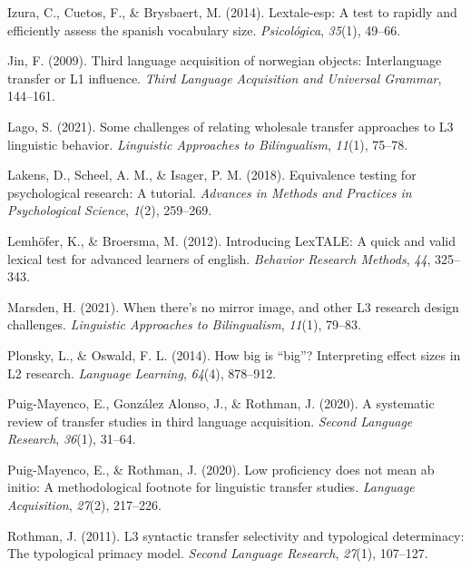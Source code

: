 \documentclass[
  man]{apa6}
\newlength{\cslhangindent}
\newlength{\cslentryspacingunit} %
\newenvironment{CSLReferences}[2] %
 {%
  \setlength{\parindent}{0pt}
  \ifodd #1
  \let\oldpar\par
  \def\par{\hangindent=\cslhangindent\oldpar}
  \fi
  \setlength{\parskip}{#2\cslentryspacingunit}
 }%
 {}
\begin{document}
\begin{CSLReferences}{1}{0}
\leavevmode{}%
Izura, C., Cuetos, F., \& Brysbaert, M. (2014). Lextale-esp: A test to rapidly and efficiently assess the spanish vocabulary size. \emph{Psicol{ó}gica}, \emph{35}(1), 49--66.

\leavevmode{}%
Jin, F. (2009). Third language acquisition of norwegian objects: Interlanguage transfer or L1 influence. \emph{Third Language Acquisition and Universal Grammar}, 144--161.

\leavevmode{}%
Lago, S. (2021). Some challenges of relating wholesale transfer approaches to L3 linguistic behavior. \emph{Linguistic Approaches to Bilingualism}, \emph{11}(1), 75--78.

\leavevmode{}%
Lakens, D., Scheel, A. M., \& Isager, P. M. (2018). Equivalence testing for psychological research: A tutorial. \emph{Advances in Methods and Practices in Psychological Science}, \emph{1}(2), 259--269.

\leavevmode{}%
Lemhöfer, K., \& Broersma, M. (2012). Introducing LexTALE: A quick and valid lexical test for advanced learners of english. \emph{Behavior Research Methods}, \emph{44}, 325--343.

\leavevmode{}%
Marsden, H. (2021). When there's no mirror image, and other L3 research design challenges. \emph{Linguistic Approaches to Bilingualism}, \emph{11}(1), 79--83.

\leavevmode{}%
Plonsky, L., \& Oswald, F. L. (2014). How big is {``big''}? Interpreting effect sizes in L2 research. \emph{Language Learning}, \emph{64}(4), 878--912.

\leavevmode{}%
Puig-Mayenco, E., González Alonso, J., \& Rothman, J. (2020). A systematic review of transfer studies in third language acquisition. \emph{Second Language Research}, \emph{36}(1), 31--64.

\leavevmode{}%
Puig-Mayenco, E., \& Rothman, J. (2020). Low proficiency does not mean ab initio: A methodological footnote for linguistic transfer studies. \emph{Language Acquisition}, \emph{27}(2), 217--226.

\leavevmode{}%
Rothman, J. (2011). L3 syntactic transfer selectivity and typological determinacy: The typological primacy model. \emph{Second Language Research}, \emph{27}(1), 107--127.


\end{CSLReferences}
\end{document}
